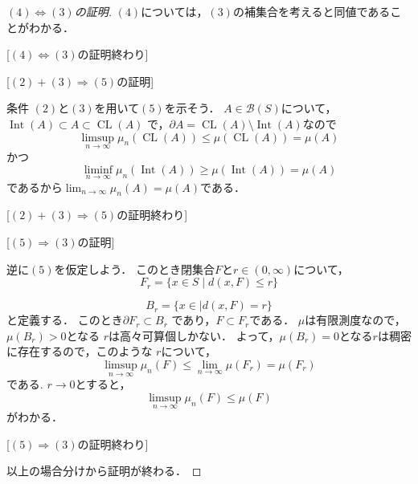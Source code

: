 \documentclass[leqno, a4paper, 12pt]{jsarticle}
\newcommand{\To}{\Longrightarrow}
\DeclareMathOperator{\cl}{CL}
\DeclareMathOperator{\nai}{Int}
\begin{document}
\begin{proof}
[$(4)\iff (3)$の証明]

$(4)$については，$(3)$の補集合を考えると同値であることがわかる．

[$(4)\iff (3)$の証明終わり]

[$(2)+(3)\To(5)$の証明]

条件
$(2)$と$(3)$を用いて$(5)$を示そう．
$A\in \mathcal{B}(S)$について，$\nai(A)\subset A\subset \cl(A)$
で，$\partial A=\cl(A)\setminus \nai(A)$なので
\[
\limsup_{n\to \infty}\mu_n(\cl(A))\le \mu(\cl(A))=\mu(A)
\]
かつ
\[
\liminf_{n\to \infty}\mu_n(\nai(A))\ge \mu(\nai(A))=\mu(A)
\]
であるから$\lim_{n\to \infty}\mu_n(A)=\mu(A)$である．

[$(2)+(3)\To(5)$の証明終わり]

[$(5)\To(3)$の証明]

逆に$(5)$を仮定しよう．
このとき閉集合$F$と$r\in  (0, \infty)$について，
\[
F_{r}=\{x\in S\mid d(x, F)\le r\}
\]

\[
B_r=\{x\in \mid d(x, F)=r\}
\]
と定義する．
このとき$\partial F_r\subset B_r$
であり，$F\subset F_r$である．
$\mu$は有限測度なので，$\mu(B_r)>0$となる
$r$は高々可算個しかない．
よって，$\mu(B_r)=0$となる$r$は稠密に存在するので，このような
$r$について，
\[
\limsup_{n\to \infty}\mu_n(F)\le \lim_{n\to \infty}\mu(F_r)=\mu(F_r)
\]
である.
$r\to 0$とすると，
\[
\limsup_{n\to \infty}\mu_n(F)\le \mu(F)
\]
がわかる．

[$(5)\To(3)$の証明終わり]

以上の場合分けから証明が終わる．
\end{proof}
\end{document}
